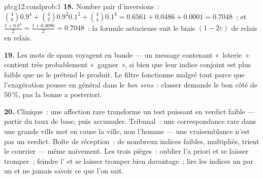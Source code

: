 \begin{solution}{pb:g12:condprob:1}
\textbf{18.} Nombre pair d'inversions~: $\binom40 0.9^4 +
\binom42 0.9^2 0.1^2 + \binom44 0.1^4 = 0.6561 + 0.0486 + 0.0001 =
0.7048$~; et $\frac{1 + 0.8^4}{2} = \frac{1 + 0.4096}{2} =
0.7048$~: la formule astucieuse suit le biais $(1 - 2\varepsilon)$
de relais en relais.

\textbf{19.} Les mots de spam voyagent en bande --- un message
contenant «~loterie~» contient très probablement «~gagner~», si
bien que leur indice conjoint est plus faible que ne le prétend le
produit. Le filtre fonctionne malgré tout parce que l'exagération
pousse en général dans le \emph{bon sens}~: classer demande le bon
côté de $50\,\%$, pas la bonne  a posteriori.

\textbf{20.} Clinique~: une affection rare transforme un test
puissant en verdict faible --- partir du taux de base, puis
accumuler. Tribunal~: une correspondance rare dans une grande ville
met en cause la ville, non l'homme --- une vraisemblance n'est pas
un verdict. Boîte de réception~: de nombreux indices faibles,
multipliés, trient le courrier --- même naïvement. Les trois
pièges~: oublier l'a priori et se laisser tromper~; feindre
l' et se laisser tromper bien davantage~; lire les
indices un par un et ne jamais savoir ce que l'on sait.
\end{solution}
